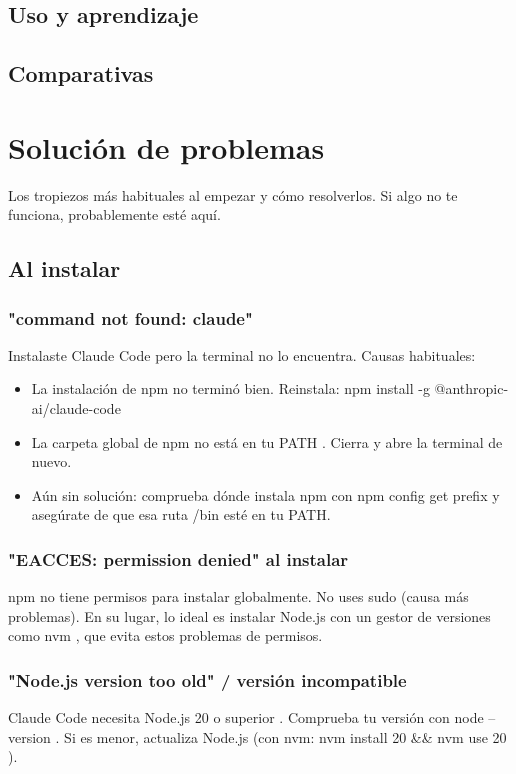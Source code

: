 \documentclass[11pt,a4paper]{book}
\begin{document}
\section{Uso y aprendizaje}
\section{Comparativas}
\chapter{Solución de problemas}
Los tropiezos más habituales al empezar y cómo resolverlos. Si algo no te funciona, probablemente esté aquí.

\section{Al instalar}
\subsection{"command not found: claude"}
Instalaste Claude Code pero la terminal no lo encuentra. Causas habituales:

\begin{itemize}\item La instalación de npm no terminó bien. Reinstala: npm install -g @anthropic-ai/claude-code\end{itemize}
\begin{itemize}\item La carpeta global de npm no está en tu PATH . Cierra y abre la terminal de nuevo.\end{itemize}
\begin{itemize}\item Aún sin solución: comprueba dónde instala npm con npm config get prefix y asegúrate de que esa ruta /bin esté en tu PATH.\end{itemize}
\subsection{"EACCES: permission denied" al instalar}
npm no tiene permisos para instalar globalmente. No uses sudo (causa más problemas). En su lugar, lo ideal es instalar Node.js con un gestor de versiones como nvm , que evita estos problemas de permisos.

\subsection{"Node.js version too old" / versión incompatible}
Claude Code necesita Node.js 20 o superior . Comprueba tu versión con node --version . Si es menor, actualiza Node.js (con nvm: nvm install 20 \&\& nvm use 20 ).
\end{document}
